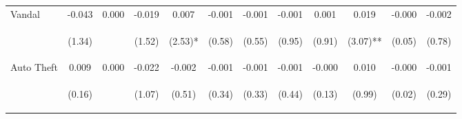 \begin{tabular}{lccccccccccc}
\noalign{\smallskip}Vandal & -0.043 & 0.000 & -0.019 & 0.007 & -0.001 & -0.001 & -0.001 & 0.001 & 0.019 & -0.000 & -0.002\\
 & \begin{footnotesize}(1.34)\end{footnotesize} & \begin{footnotesize}\end{footnotesize} & \begin{footnotesize}(1.52)\end{footnotesize} & \begin{footnotesize}(2.53)*\end{footnotesize} & \begin{footnotesize}(0.58)\end{footnotesize} & \begin{footnotesize}(0.55)\end{footnotesize} & \begin{footnotesize}(0.95)\end{footnotesize} & \begin{footnotesize}(0.91)\end{footnotesize} & \begin{footnotesize}(3.07)**\end{footnotesize} & \begin{footnotesize}(0.05)\end{footnotesize} & \begin{footnotesize}(0.78)\end{footnotesize}\\
\noalign{\smallskip}Auto Theft & 0.009 & 0.000 & -0.022 & -0.002 & -0.001 & -0.001 & -0.001 & -0.000 & 0.010 & -0.000 & -0.001\\
 & \begin{footnotesize}(0.16)\end{footnotesize} & \begin{footnotesize}\end{footnotesize} & \begin{footnotesize}(1.07)\end{footnotesize} & \begin{footnotesize}(0.51)\end{footnotesize} & \begin{footnotesize}(0.34)\end{footnotesize} & \begin{footnotesize}(0.33)\end{footnotesize} & \begin{footnotesize}(0.44)\end{footnotesize} & \begin{footnotesize}(0.13)\end{footnotesize} & \begin{footnotesize}(0.99)\end{footnotesize} & \begin{footnotesize}(0.02)\end{footnotesize} & \begin{footnotesize}(0.29)\end{footnotesize}\\

\end{tabular}
